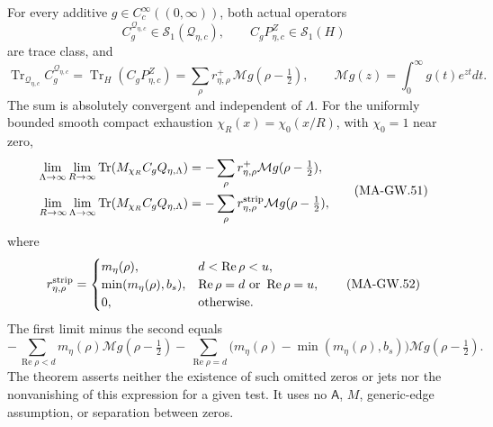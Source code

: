 For every additive \(g\in C_c^\infty((0,\infty))\), both
actual operators
\[
 C_g^{\mathcal Q_{\eta,c}}\in\mathcal S_1(\mathcal Q_{\eta,c}),
 \qquad
 C_gP_{\eta,c}^Z\in\mathcal S_1(H)
 \tag{MA-GW.49}
\]
are trace class, and
\[
 \operatorname{Tr}_{\mathcal Q_{\eta,c}}C_g^{\mathcal Q_{\eta,c}}
   =\operatorname{Tr}_H(C_gP_{\eta,c}^Z)
   =\sum_\rho r^+_{\eta,\rho}\,\mathcal Mg(\rho-\tfrac12),
 \qquad
 \mathcal Mg(z)=\int_0^\infty g(t)e^{zt}dt .
 \tag{MA-GW.50}
\]
The sum is absolutely convergent and independent of \(\Lambda\).
For the uniformly bounded smooth compact exhaustion
\(\chi_R(x)=\chi_0(x/R)\), with \(\chi_0=1\) near zero,
\[
 \begin{aligned}
 \lim_{\Lambda\to\infty}\lim_{R\to\infty}
    \operatorname{Tr}(M_{\chi_R}C_gQ_{\eta,\Lambda})
       &=-\sum_\rho r^+_{\eta,\rho}\mathcal Mg(\rho-\tfrac12),\\
 \lim_{R\to\infty}\lim_{\Lambda\to\infty}
    \operatorname{Tr}(M_{\chi_R}C_gQ_{\eta,\Lambda})
       &=-\sum_\rho r^{\rm strip}_{\eta,\rho}
                                      \mathcal Mg(\rho-\tfrac12),
 \end{aligned}
 \tag{MA-GW.51}
\]
where
\[
 r^{\rm strip}_{\eta,\rho}=
 \begin{cases}
 m_\eta(\rho),&d<\operatorname{Re}\rho<u,\\
 \min(m_\eta(\rho),b_s),&
            \operatorname{Re}\rho=d\text{ or }\operatorname{Re}\rho=u,\\
 0,&\text{otherwise}.
 \end{cases}
 \tag{MA-GW.52}
\]
The first limit minus the second equals
\[
 -\sum_{\operatorname{Re}\rho<d}
             m_\eta(\rho)\mathcal Mg(\rho-\tfrac12)
 -\sum_{\operatorname{Re}\rho=d}
        \bigl(m_\eta(\rho)-\min(m_\eta(\rho),b_s)\bigr)
                                  \mathcal Mg(\rho-\tfrac12).
 \tag{MA-GW.53}
\]
The theorem asserts neither the existence of such omitted zeros
or jets nor the nonvanishing of this expression for a given test.
It uses no \(\mathsf A\), \(M\), generic-edge assumption, or
separation between zeros.


